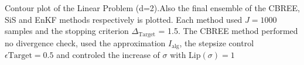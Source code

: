 Contour plot of the Linear Problem (d=2).Also the final ensemble of the CBREE, SiS and EnKF methods respectively is plotted. Each method used $J=1000$ samples and the stopping criterion $\Delta_{\text{Target}}$ = 1.5. The CBREE method performed no divergence check, used the approximation $I_\text{alg}$, the stepsize control $\epsilon{\text{Target}}=0.5$ and controled the increase of $\sigma$ with $\text{Lip}(\sigma) = 1$